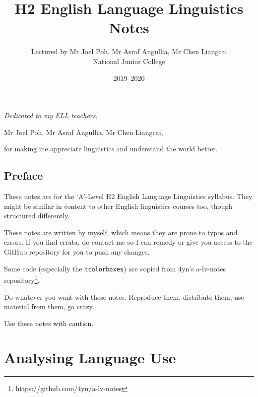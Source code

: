 \documentclass[10pt]{book}
\title{H2 English Language Linguistics Notes}
\author{Lectured by Mr Joel Poh, Mr Asraf Angullia, Mr Chen Liangcai \\ National Junior College}
\date{2019--2020}
\begin{document}
\frontmatter

\maketitle

\newpage
\vspace*{\fill}
\begin{center}
	\it Dedicated to my ELL teachers, \par
	Mr Joel Poh, Mr Asraf Angullia, Mr Chen Liangcai, \par
	for making me appreciate linguistics and understand the world better.
\end{center}

\vspace*{\fill}
\chapter*{Preface}
These notes are for the `A'-Level H2 English Language Linguistics syllabus. They might be similar in content to other English linguistics courses too, though structured differently.

These notes are written by myself, which means they are prone to typos and errors. If you find errata, do contact me so I can remedy or give you access to the GitHub repository for you to push any changes.

Some code (especially the \texttt{tcolorboxes}) are copied from 4yn's a-lv-notes repository\footnote{https://github.com/4yn/a-lv-notes}.

Do whatever you want with these notes. Reproduce them, distribute them, use material from them, go crazy. 

Use these notes with caution.

\newpage
\begin{multicols}{2}
\tableofcontents
\end{multicols}

\newpage

\mainmatter
\part{Analysing Language Use}
\begin{multicols}{2}








\end{multicols}
\end{document}
